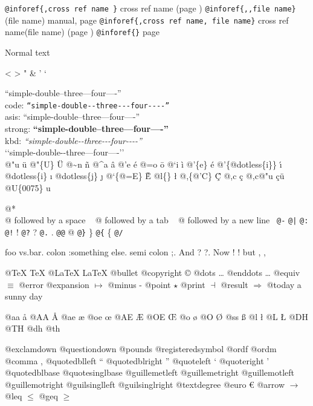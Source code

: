 \documentclass{book}
\begin{document}
\texttt{@inforef\{,cross ref name \}} cross ref name (page \pageref{anchor:})
\texttt{@inforef\{,,file name\}} (file name) manual, page \pageref{anchor:}
\texttt{@inforef\{,cross ref name, file name\}} cross ref name(file name) (page \pageref{anchor:})
\texttt{@inforef\{\}} page \pageref{anchor:}



Normal text

<
>
"
\&
'
`

``simple-double--three---four----''\leavevmode{}\\
code: \texttt{``simple-double{-}{-}three{-}{-}{-}four{-}{-}{-}-''} \leavevmode{}\\
asis: ``simple-double--three---four----'' \leavevmode{}\\
strong: \textbf{``simple-double--three---four----''} \leavevmode{}\\
kbd: {\ttfamily\textsl{``simple-double{-}{-}three{-}{-}{-}four{-}{-}{-}-''}} \leavevmode{}\\

`\hbox{}`simple-double-\hbox{}-three---four----'\hbox{}'\leavevmode{}\\


@"u \"{u} 
@"\{U\} \"{U} 
@\~{}n \~{n}
@\^{}a \^{a}
@'e \'{e}
@=o \={o}
@`i \`{i}
@'\{e\} \'{e}
@'\{@dotless\{i\}\} \'{\i{}} 
@dotless\{i\} \i{}
@dotless\{j\} \j{}
@`\{@=E\} \`{\={E}} 
@l\{\} \l{}
@,\{@'C\} \c{\'{C}}
@,c \c{c}
@,c@"u \c{c}\"{u} \leavevmode{}\\

@U\{0075\} u

@* \leavevmode{}\\
@ followed by a space
\ {}
@ followed by a tab
\ {}
@ followed by a new line
\ {}\texttt{@-} \-{}
\texttt{@|} 
\texttt{@:} \@
\texttt{@!} \@!
\texttt{@?} \@?
\texttt{@.} \@.
\texttt{@@} @
\texttt{@\}} \}
\texttt{@\{} \{
\texttt{@/} 

foo vs.\@ bar. 
colon :\@And something else.
semi colon ;\@.
And ? ?\@.
Now ! !\@@
but , ,\@

@TeX \TeX{}
@LaTeX \LaTeX{}
@bullet \textbullet{}
@copyright \copyright{}
@dots \dots{}\@
@enddots \dots{}
@equiv $\equiv{}$
@error 
@expansion $\mapsto{}$
@minus -
@point $\star{}$
@print $\dashv{}$
@result $\Rightarrow{}$
@today a sunny day

@aa \aa{}
@AA \AA{}
@ae \ae{}
@oe \oe{}
@AE \AE{}
@OE \OE{}
@o \o{}
@O \O{}
@ss \ss{}
@l \l{}
@L \L{}
@DH \DH{}
@TH \TH{}
@dh \dh{}
@th \th{}

@exclamdown \textexclamdown{}
@questiondown \textquestiondown{}
@pounds \textsterling{}
@registeredsymbol \circledR{}
@ordf \textordfeminine{}
@ordm \textordmasculine{}
@comma ,
@quotedblleft \textquotedblleft{}
@quotedblright \textquotedblright{}
@quoteleft \textquoteleft{}
@quoteright \textquoteright{}
@quotedblbase \quotedblbase{}
@quotesinglbase \quotesinglbase{}
@guillemetleft \guillemotleft{}
@guillemetright \guillemotright{}
@guillemotleft \guillemotleft{}
@guillemotright \guillemotright{}
@guilsinglleft \guilsinglleft{}
@guilsinglright \guilsinglright{}
@textdegree \textdegree{}
@euro \euro{}
@arrow $\rightarrow{}$
@leq $\leq{}$
@geq $\geq{}$
\end{document}
